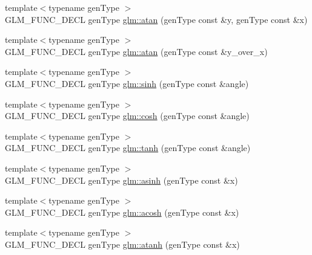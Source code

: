 \begin{DoxyCompactItemize}
\item 
{\footnotesize template$<$typename gen\-Type $>$ }\\G\-L\-M\-\_\-\-F\-U\-N\-C\-\_\-\-D\-E\-C\-L gen\-Type \hyperlink{group__core__func__trigonometric_gabf80ac0817d1db032dd6a0969aa2b84a}{glm\-::atan} (gen\-Type const \&y, gen\-Type const \&x)
\item 
{\footnotesize template$<$typename gen\-Type $>$ }\\G\-L\-M\-\_\-\-F\-U\-N\-C\-\_\-\-D\-E\-C\-L gen\-Type \hyperlink{group__core__func__trigonometric_gaa7be96f0c12a40eeac5c7f04a3d465a1}{glm\-::atan} (gen\-Type const \&y\-\_\-over\-\_\-x)
\item 
{\footnotesize template$<$typename gen\-Type $>$ }\\G\-L\-M\-\_\-\-F\-U\-N\-C\-\_\-\-D\-E\-C\-L gen\-Type \hyperlink{group__core__func__trigonometric_ga2e8c9a896e803661058de83429aa6eda}{glm\-::sinh} (gen\-Type const \&angle)
\item 
{\footnotesize template$<$typename gen\-Type $>$ }\\G\-L\-M\-\_\-\-F\-U\-N\-C\-\_\-\-D\-E\-C\-L gen\-Type \hyperlink{group__core__func__trigonometric_gaa7685634f6e920ba9a683e5ec7aed976}{glm\-::cosh} (gen\-Type const \&angle)
\item 
{\footnotesize template$<$typename gen\-Type $>$ }\\G\-L\-M\-\_\-\-F\-U\-N\-C\-\_\-\-D\-E\-C\-L gen\-Type \hyperlink{group__core__func__trigonometric_ga941f20e5315113d1a2e037f073a62f04}{glm\-::tanh} (gen\-Type const \&angle)
\item 
{\footnotesize template$<$typename gen\-Type $>$ }\\G\-L\-M\-\_\-\-F\-U\-N\-C\-\_\-\-D\-E\-C\-L gen\-Type \hyperlink{group__core__func__trigonometric_gaa52acc1218a5ddd0f8d94fcd098685b1}{glm\-::asinh} (gen\-Type const \&x)
\item 
{\footnotesize template$<$typename gen\-Type $>$ }\\G\-L\-M\-\_\-\-F\-U\-N\-C\-\_\-\-D\-E\-C\-L gen\-Type \hyperlink{group__core__func__trigonometric_ga961d72b4a20d09d6e71fdf076ad4f433}{glm\-::acosh} (gen\-Type const \&x)
\item 
{\footnotesize template$<$typename gen\-Type $>$ }\\G\-L\-M\-\_\-\-F\-U\-N\-C\-\_\-\-D\-E\-C\-L gen\-Type \hyperlink{group__core__func__trigonometric_gaa20b78cb9c12e30bd5a3054b8cb3d099}{glm\-::atanh} (gen\-Type const \&x)
\end{DoxyCompactItemize}


